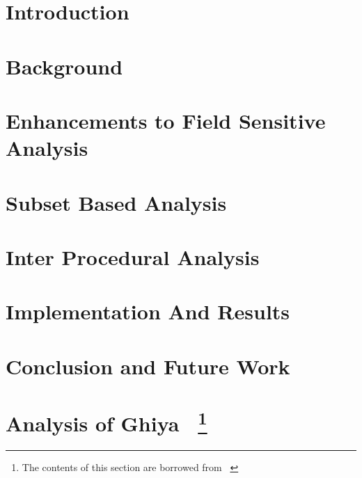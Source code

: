 \documentclass[a4paper,12pt]{report}
\renewcommand{\headrulewidth}{0pt}
\begin{document}

\newpage





\newpage
{}




\tableofcontents

\listoffigures


\newpage
{}
\fancyhead[RO]{\thepage}
\fancyhead[LO]{\slshape \leftmark}
\fancyfoot[CO]{}
\renewcommand{\headrulewidth}{0.5pt}
\noindent
\chapter{Introduction\label{intro}}

% 
% 
\chapter{Background \label{Background}}


\chapter{Enhancements to Field Sensitive Analysis\label{Enhancements}}


\chapter{Subset Based Analysis \label{Subsetbased}}



\chapter{Inter Procedural Analysis\label{Interprocedural}}


\chapter{Implementation And Results \label{Implementation}}


\chapter{Conclusion and Future Work\label{Conclusion}}


\appendix
\chapter[Analysis of Ghiya]{Analysis of Ghiya ~\cite{Ghiya96}\footnote{The contents of this section are borrowed from ~\cite{Ghiya96}}}




\end{document}
